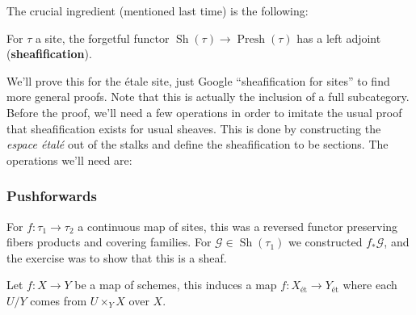 The crucial ingredient (mentioned last time) is the following:

\begin{theorem}

For \(\tau\) a site, the forgetful functor
\({\operatorname{Sh}}(\tau) \to {\operatorname{Presh}}(\tau)\) has a
left adjoint (\textbf{sheafification}).

\end{theorem}

We'll prove this for the étale site, just Google ``sheafification for
sites'' to find more general proofs. Note that this is actually the
inclusion of a full subcategory. Before the proof, we'll need a few
operations in order to imitate the usual proof that sheafification
exists for usual sheaves. This is done by constructing the \emph{espace
étalé} out of the stalks and define the sheafification to be sections.
The operations we'll need are:

\hypertarget{pushforwards}{%
\subsubsection{Pushforwards}\label{pushforwards}}

For \(f: \tau_1 \to \tau_2\) a continuous map of sites, this was a
reversed functor preserving fibers products and covering families. For
\(\mathcal{G}\in {\operatorname{Sh}}(\tau_1)\) we constructed
\(f_* \mathcal{G}\), and the exercise was to show that this is a sheaf.

\begin{example}[?]

Let \(f:X\to Y\) be a map of schemes, this induces a map
\(f: X_\text{ét}\to Y_\text{ét}\) where each \(U/Y\) comes from
\(U\times_Y X\) over \(X\).

\end{example}

